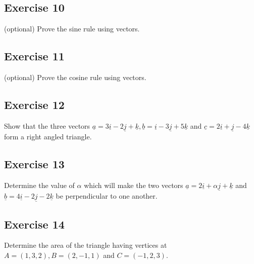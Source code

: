 \documentclass[
  english,
  11pt,
  oneside]{book}
\newcommand{\slide}{}
\theoremstyle{definition}
\theoremstyle{definition}
\theoremstyle{definition}
\theoremstyle{definition}
\theoremstyle{remark}
\begin{document}
\slide

\subsection*{Exercise 10}\label{exercise-10-1}

(optional) Prove the sine rule using vectors.

\slide

\subsection*{Exercise 11}\label{exercise-11-1}

(optional) Prove the cosine rule using vectors.

\slide

\subsection*{Exercise 12}\label{exercise-12}

Show that the three vectors \(\underline{a} = 3\underline{i} - 2\underline{j} + \underline{k}, \underline{b} = \underline{i} - 3\underline{j} + 5\underline{k}\) and \(\underline{c}= 2\underline{i} + \underline{j} - 4\underline{k}\) form a right angled triangle.

\slide

\subsection*{Exercise 13}\label{exercise-13}

Determine the value of \(\alpha\) which will make the two vectors \(\underline{a} = 2\underline{i} + \alpha\underline{j} + \underline{k}\) and \(\underline{b} = 4\underline{i} - 2\underline{j} - 2\underline{k}\) be perpendicular to one another.

\slide

\subsection*{Exercise 14}\label{exercise-14}

Determine the area of the triangle having vertices at \(A=(1,3,2), B=(2, -1,1)\) and \(C=(-1,2,3)\).
\end{document}
